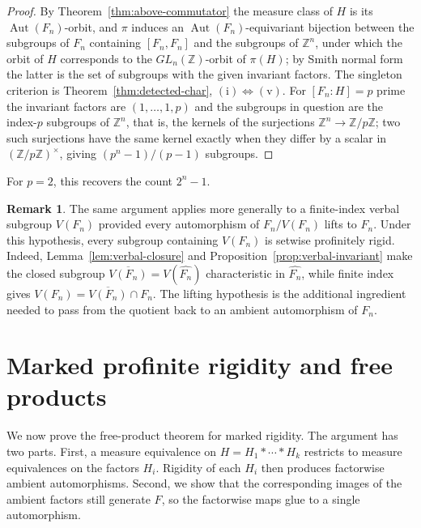 \documentclass[11pt]{amsart}
\theoremstyle{plain}
\theoremstyle{definition}
\newtheorem{remark}[theorem]{Remark}
\newcommand{\Aut}{\operatorname{Aut}}
\begin{document}
\begin{proof}
By Theorem~\ref{thm:above-commutator} the measure class of $H$ is its
$\Aut(F_n)$-orbit, and $\pi$ induces an $\Aut(F_n)$-equivariant bijection between
the subgroups of $F_n$ containing $[F_n,F_n]$ and the subgroups of
$\mathbb Z^{n}$, under which the orbit of $H$ corresponds to the
$GL_n(\mathbb Z)$-orbit of $\pi(H)$; by Smith normal form the latter is the set
of subgroups with the given invariant factors.  The singleton criterion is
Theorem~\ref{thm:detected-char}, $(\mathrm i)\Leftrightarrow(\mathrm v)$.  For
$[F_n:H]=p$ prime the invariant factors are $(1,\dots,1,p)$ and the subgroups in
question are the index-$p$ subgroups of $\mathbb Z^{n}$, that is, the kernels of
the surjections $\mathbb Z^{n}\to\mathbb Z/p\mathbb Z$; two such surjections have
the same kernel exactly when they differ by a scalar in
$(\mathbb Z/p\mathbb Z)^{\times}$, giving
$(p^{n}-1)/(p-1)$ subgroups.
\end{proof}

For $p=2$, this recovers the count $2^n-1$.

\begin{remark}
The same argument applies more generally to a finite-index verbal subgroup
$V(F_n)$ provided every automorphism of $F_n/V(F_n)$ lifts to $F_n$. Under this
hypothesis, every subgroup containing $V(F_n)$ is setwise profinitely rigid.
Indeed, Lemma~\ref{lem:verbal-closure} and
Proposition~\ref{prop:verbal-invariant} make the closed subgroup
$\overline{V(F_n)}=V(\widehat{F_n})$ characteristic in $\widehat{F_n}$, while
finite index gives $V(F_n)=\overline{V(F_n)}\cap F_n$. The lifting hypothesis is
the additional ingredient needed to pass from the quotient back to an ambient
automorphism of $F_n$.
\end{remark}


\section{Marked profinite rigidity and free products}\label{sec:freeproducts}


We now prove the free-product theorem for marked rigidity. The argument has two
parts. First, a measure equivalence on
$H=H_1*\cdots*H_k$ restricts to measure equivalences on the factors $H_i$.
Rigidity of each $H_i$ then produces factorwise ambient automorphisms. Second,
we show that the corresponding images of the ambient factors still generate
$F$, so the factorwise maps glue to a single automorphism.
\end{document}
